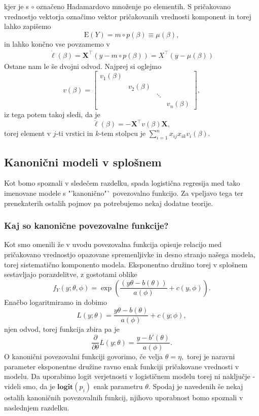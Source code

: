 \documentclass[12pt,a4paper]{amsart}
\theoremstyle{definition} %
\theoremstyle{plain} %
\begin{document}
kjer je s $\circ$ označeno Hadamardovo množenje po elementih.
S pričakovano vrednostjo vektorja označimo vektor pričakovanih vrednosti komponent in torej lahko zapišemo
\begin{equation}
    \mathrm{E}(Y) = m \circ p(\beta) \equiv \mu(\beta),
\end{equation}
in lahko končno vse povzamemo v
\begin{align}\label{prvi}
    \dot{\ell}(\beta) = \mathbf{X}^\top(y - m \circ p(\beta)) = X^\top(y - \mu(\beta))
\end{align}
Ostane nam le še dvojni odvod. Najprej si oglejmo
\[
    v(\beta) = \begin{bmatrix}
        v_{1}(\beta)  & & &\\
        & v_{2}(\beta) & & \\
        & & \ddots & \\
        & & & v_{n}(\beta)
    \end{bmatrix},
\]
iz tega potem takoj sledi, da je
\begin{equation} \label{drugi}
    \ddot{\ell}(\beta) = -\mathbf{X}^\top v(\beta)\mathbf{X},
\end{equation}
torej element v $j$-ti vrstici in $k$-tem stolpcu je $\sum_{i=1}^{n}x_{ij}x_{ik}v_{i}(\beta).$

\subsection{Kanonični modeli v splošnem}
Kot bomo spoznali v sledečem razdelku, spada logistična regresija med tako imenovane modele s "'kanonično"` povezovalno funkcijo. 
Za vpeljavo tega ter prenekaterih ostalih pojmov pa potrebujemo nekaj dodatne teorije.

\subsubsection{Kaj so kanonične povezovalne funkcije?}
Kot smo omenili že v uvodu povezovalna funkcija opisuje relacijo med pričakovano vrednostjo opazovane spremenljivke in desno stranjo našega modela, torej
sistematično komponento modela. Eksponentno družino torej v splošnem sestavljajo porazdelitve, z gostotami oblike
\[
    f_{Y}(y; \theta, \phi) = \exp{\left(\frac{(y\theta - b(\theta))}{a(\phi)} + c(y, \phi)\right)}.
\]
Enačbo logaritmiramo in dobimo
\[
    L(y;\theta) = \frac{y\theta-b(\theta)}{a(\phi)} + c(y;\phi),
\]
njen odvod, torej funkcija zbira pa je 
\[
    \frac{\partial}{\partial \theta} L(y;\theta) = \frac{y-b'(\theta)}{a(\phi)}.
\]
O kanonični povezovalni funkciji govorimo, če velja $\theta=\eta,$ torej je naravni parameter eksponentne družine ravno enak funkciji pričakovane vrednosti v modelu.
Da uporabimo logit verjetnosti v logističnem modelu torej ni naključje - videli smo, da je $\textbf{logit}(p_{i})$ enak parametru $\theta.$ Spodaj je navedenih še nekaj ostalih
kanoničnih povezovalnih funkcij, njihovo uporabnost bomo spoznali v naslednjem razdelku.
\end{document}
